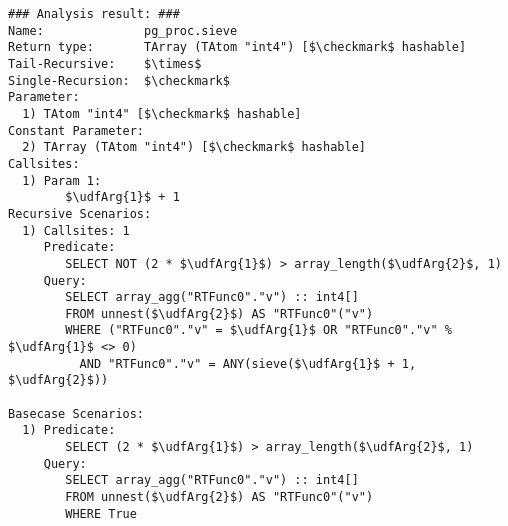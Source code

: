 \begin{lstlisting}[basicstyle=\ttfamily\scriptsize]
### Analysis result: ###
Name:              pg_proc.sieve
Return type:       TArray (TAtom "int4") [$\checkmark$ hashable]
Tail-Recursive:    $\times$
Single-Recursion:  $\checkmark$
Parameter:
  1) TAtom "int4" [$\checkmark$ hashable]
Constant Parameter:
  2) TArray (TAtom "int4") [$\checkmark$ hashable]
Callsites:
  1) Param 1:
        $\udfArg{1}$ + 1
Recursive Scenarios:
  1) Callsites: 1
     Predicate:
        SELECT NOT (2 * $\udfArg{1}$) > array_length($\udfArg{2}$, 1)
     Query:
        SELECT array_agg("RTFunc0"."v") :: int4[]
        FROM unnest($\udfArg{2}$) AS "RTFunc0"("v")
        WHERE ("RTFunc0"."v" = $\udfArg{1}$ OR "RTFunc0"."v" % $\udfArg{1}$ <> 0) 
          AND "RTFunc0"."v" = ANY(sieve($\udfArg{1}$ + 1, $\udfArg{2}$))

Basecase Scenarios:
  1) Predicate:
        SELECT (2 * $\udfArg{1}$) > array_length($\udfArg{2}$, 1)
     Query:
        SELECT array_agg("RTFunc0"."v") :: int4[]        
        FROM unnest($\udfArg{2}$) AS "RTFunc0"("v")
        WHERE True
\end{lstlisting}